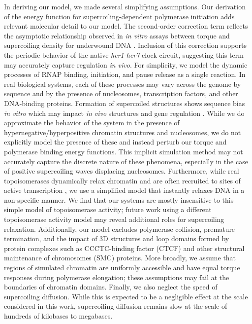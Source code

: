 \documentclass[11pt]{article}
\begin{document}
In deriving our model, we made several simplifying assumptions. Our derivation of the energy function for supercoiling-dependent polymerase initiation adds relevant molecular detail to our model. The second-order correction term reflects the asymptotic relationship observed in \textit{in vitro}  assays between torque and supercoiling density for underwound DNA \parencite{leSynergisticCoordinationChromatin2019}. Inclusion of this correction supports the periodic behavior of the native \emph{her1-her7} clock circuit, suggesting this term may accurately capture regulation \textit{in vivo}. For simplicity, we model the dynamic processes of RNAP binding, initiation, and pause release as a single reaction. In real biological systems, each of these processes may vary across the genome by sequence and by the presence of nucleosomes, transcription factors, and other DNA-binding proteins. Formation of supercoiled structures shows sequence bias \textit{in vitro} which may impact \textit{in vivo} structures and gene regulation \parencite{kimDNASequenceEncodes2018}.  While we do approximate the behavior of the system in the presence of hypernegative/hyperpositive chromatin structures and nucleosomes, we do not explicitly model the presence of these and instead perturb our torque and polymerase binding energy functions. This implicit simulation method may not accurately capture the discrete nature of these phenomena, especially in the case of positive supercoiling waves displacing nucleosomes. Furthermore, while real topoisomerases dynamically relax chromatin and are often recruited to sites of active transcription \parencite{baranelloRNAPolymeraseII2016}, we use a simplified model that instantly relaxes DNA in a non-specific manner. We find that our systems are mostly insensitive to this simple model of topoisomerase activity; future work using a different topoisomerase activity model may reveal additional roles for supercoiling relaxation. Additionally, our model excludes polymerase collision, premature termination, and the impact of 3D structures and loop domains formed by protein complexes such as CCCTC-binding factor (CTCF) and other structural maintenance of chromosomes (SMC) proteins. More broadly, we assume that regions of simulated chromatin are uniformly accessible and have equal torque responses during polymerase elongation; these assumptions may fail at the boundaries of chromatin domains. Finally, we also neglect the speed of supercoiling diffusion. While this is expected to be a negligible effect at the scale considered in this work, supercoiling diffusion remains slow at the scale of hundreds of kilobases to megabases.
\end{document}
